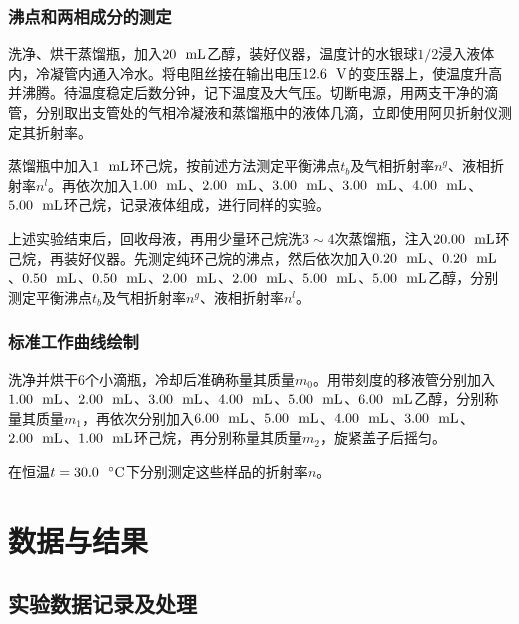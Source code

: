 \documentclass[12pt]{article}
\begin{document}
			\subsubsection{沸点和两相成分的测定}
		洗净、烘干蒸馏瓶，加入$20\ \ {\rm mL}$乙醇，装好仪器，温度计的水银球$1/2$浸入液体内，冷凝管内通入冷水。将电阻丝接在输出电压$12.6\ \ {\rm V}$的变压器上，使温度升高并沸腾。待温度稳定后数分钟，记下温度及大气压。切断电源，用两支干净的滴管，分别取出支管处的气相冷凝液和蒸馏瓶中的液体几滴，立即使用阿贝折射仪测定其折射率。 \par 
		蒸馏瓶中加入$1\ \ {\rm mL}$环己烷，按前述方法测定平衡沸点$t_{b}$及气相折射率$n^{g}$、液相折射率$n^{l}$。再依次加入$1.00\ \ {\rm mL}$、$2.00\ \ {\rm mL}$、$3.00\ \ {\rm mL}$、$3.00\ \ {\rm mL}$、$4.00\ \ {\rm mL}$、$5.00\ \ {\rm mL}$环己烷，记录液体组成，进行同样的实验。\par
		上述实验结束后，回收母液，再用少量环己烷洗$3\sim 4$次蒸馏瓶，注入$20.00\ \ {\rm mL}$环己烷，再装好仪器。先测定纯环己烷的沸点，然后依次加入$0.20\ \ {\rm mL}$、$0.20\ \ {\rm mL}$、$0.50\ \ {\rm mL}$、$0.50\ \ {\rm mL}$、$2.00\ \ {\rm mL}$、$2.00\ \ {\rm mL}$、$5.00\ \ {\rm mL}$、$5.00\ \ {\rm mL}$乙醇，分别测定平衡沸点$t_{b}$及气相折射率$n^{g}$、液相折射率$n^{l}$。
		
\subsubsection{标准工作曲线绘制}
	洗净并烘干$6$个小滴瓶，冷却后准确称量其质量$m_{0}$。用带刻度的移液管分别加入$1.00\ \ {\rm mL}$、$2.00\ \ {\rm mL}$、$3.00\ \ {\rm mL}$、$4.00\ \ {\rm mL}$、$5.00\ \ {\rm mL}$、$6.00\ \ {\rm mL}$乙醇，分别称量其质量$m_{1}$，再依次分别加入$6.00\ \ {\rm mL}$、$5.00\ \ {\rm mL}$、$4.00\ \ {\rm mL}$、$3.00\ \ {\rm mL}$、$2.00\ \ {\rm mL}$、$1.00\ \ {\rm mL}$环己烷，再分别称量其质量$m_{2}$，旋紧盖子后摇匀。\par 
	在恒温$t=30.0\ \ {\rm ^{\circ}C}$下分别测定这些样品的折射率$n$。



\vbox{}
 \section{数据与结果}
 \subsection{实验数据记录及处理}
\end{document}

